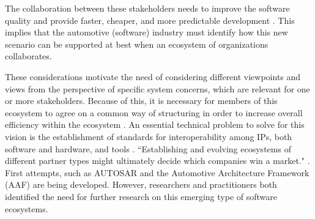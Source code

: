 The collaboration between these stakeholders needs to improve the software quality and provide faster, cheaper, and more predictable development \cite{herbsleb2016IntelligentTransparent}. This implies that the automotive (software) industry must identify how this new scenario can be supported at best when an ecosystem of organizations collaborates.

These considerations motivate the need of considering different viewpoints and views from the perspective of specific system concerns, which are relevant for one or more stakeholders. Because of this, it is necessary for members of this ecosystem to agree on a common way of structuring in order to increase overall efficiency within the ecosystem \cite{Patrizio2016AAF_Chalmers,Broy2009AAF_TUM,Broy:2006:CAS:1134285.1134292}. An essential technical problem to solve for this vision is the establishment of standards for interoperability among IPs, both software and hardware, and tools \cite{Broy:2006:CAS:1134285.1134292}. ``Establishing and evolving ecosystems of different partner types might ultimately decide which companies win a market." \cite{Bosch2016Ecosystem}. First attempts, such as AUTOSAR \cite{acm2008autosar} and the Automotive Architecture Framework (AAF) \cite{Patrizio2016AAF_Chalmers,Broy2009AAF_TUM} are being developed. However, researchers and practitioners both identified the need for further research on this emerging type of software ecosystems.

